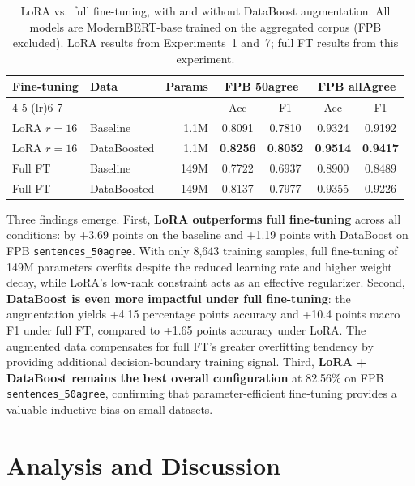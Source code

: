 \documentclass[11pt]{article}
\begin{document}
\begin{table}[h]
\centering
\caption{LoRA vs.\ full fine-tuning, with and without DataBoost augmentation. All models are ModernBERT-base trained on the aggregated corpus (FPB excluded). LoRA results from Experiments~1 and~7; full FT results from this experiment.}
\label{tab:lora-vs-full}
\begin{tabular}{llrcccc}
\toprule
\textbf{Fine-tuning} & \textbf{Data} & \textbf{Params} & \multicolumn{2}{c}{\textbf{FPB 50agree}} & \multicolumn{2}{c}{\textbf{FPB allAgree}} \\
\cmidrule(lr){4-5} \cmidrule(lr){6-7}
& & & Acc & F1 & Acc & F1 \\
\midrule
LoRA $r{=}16$ & Baseline & 1.1M & 0.8091 & 0.7810 & 0.9324 & 0.9192 \\
LoRA $r{=}16$ & DataBoosted & 1.1M & \textbf{0.8256} & \textbf{0.8052} & \textbf{0.9514} & \textbf{0.9417} \\
Full FT & Baseline & 149M & 0.7722 & 0.6937 & 0.8900 & 0.8489 \\
Full FT & DataBoosted & 149M & 0.8137 & 0.7977 & 0.9355 & 0.9226 \\
\bottomrule
\end{tabular}
\end{table}

Three findings emerge. First, \textbf{LoRA outperforms full fine-tuning} across all conditions: by +3.69 points on the baseline and +1.19 points with DataBoost on FPB \texttt{sentences\_50agree}. With only 8,643 training samples, full fine-tuning of 149M parameters overfits despite the reduced learning rate and higher weight decay, while LoRA's low-rank constraint acts as an effective regularizer. Second, \textbf{DataBoost is even more impactful under full fine-tuning}: the augmentation yields +4.15 percentage points accuracy and +10.4 points macro F1 under full FT, compared to +1.65 points accuracy under LoRA. The augmented data compensates for full FT's greater overfitting tendency by providing additional decision-boundary training signal. Third, \textbf{LoRA + DataBoost remains the best overall configuration} at 82.56\% on FPB \texttt{sentences\_50agree}, confirming that parameter-efficient fine-tuning provides a valuable inductive bias on small datasets.

\section{Analysis and Discussion}
\label{sec:discussion}
\end{document}
